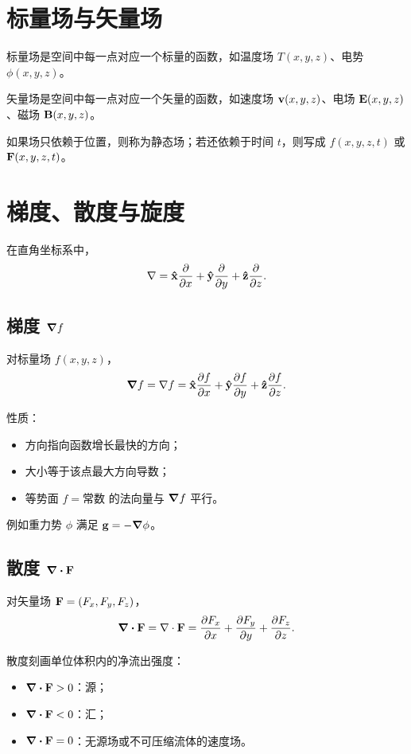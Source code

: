 \section{标量场与矢量场}

\begin{definition}
标量场是空间中每一点对应一个标量的函数，如温度场 $T(x,y,z)$、电势 $\phi(x,y,z)$。
\end{definition}

\begin{definition}
矢量场是空间中每一点对应一个矢量的函数，如速度场 $\vb{v}(x,y,z)$、电场 $\vb{E}(x,y,z)$、磁场 $\vb{B}(x,y,z)$。
\end{definition}

如果场只依赖于位置，则称为静态场；若还依赖于时间 $t$，则写成 $f(x,y,z,t)$ 或 $\vb{F}(x,y,z,t)$。

\section{梯度、散度与旋度}

在直角坐标系中，
\[
\nabla=\vu{x}\pdv{}{x}+\vu{y}\pdv{}{y}+\vu{z}\pdv{}{z}.
\]

\subsection{梯度 $\grad f$}

对标量场 $f(x,y,z)$，
\[
\grad f=\nabla f=\vu{x}\pdv{f}{x}+\vu{y}\pdv{f}{y}+\vu{z}\pdv{f}{z}.
\]

性质：
\begin{itemize}
  \item 方向指向函数增长最快的方向；
  \item 大小等于该点最大方向导数；
  \item 等势面 $f=\text{常数}$ 的法向量与 $\grad f$ 平行。
\end{itemize}

例如重力势 $\phi$ 满足 $\vb{g}=-\grad \phi$。

\subsection{散度 $\div \vb{F}$}

对矢量场 $\vb{F}=(F_x,F_y,F_z)$，
\[
\div \vb{F}=\nabla\cdot\vb{F}=\pdv{F_x}{x}+\pdv{F_y}{y}+\pdv{F_z}{z}.
\]

散度刻画单位体积内的净流出强度：
\begin{itemize}
  \item $\div \vb{F}>0$：源；
  \item $\div \vb{F}<0$：汇；
  \item $\div \vb{F}=0$：无源场或不可压缩流体的速度场。
\end{itemize}

